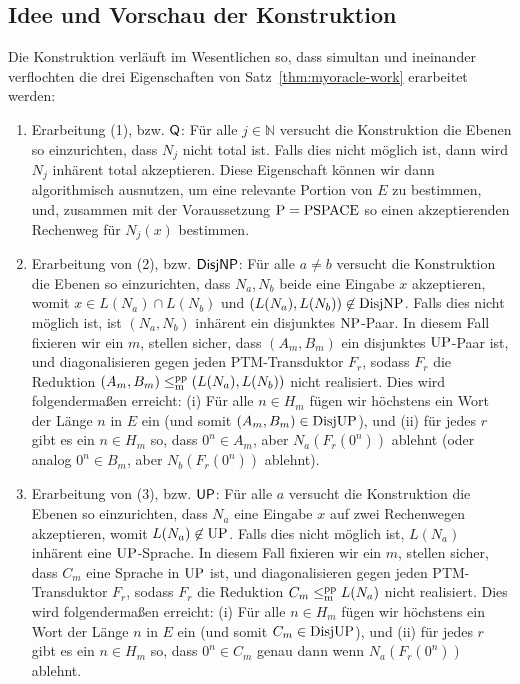 \subsection*{Idee und Vorschau der Konstruktion}

Die Konstruktion verläuft im Wesentlichen so, dass simultan und ineinander verflochten die drei Eigenschaften von Satz~\ref{thm:myoracle-work} erarbeitet werden:
\begin{enumerate}[label=\arabic*.,midpenalty=0,endpenalty=0]

    \item Erarbeitung (1), bzw. $\mathsf{Q}$: Für alle $j\in\mathbb N$ versucht die Konstruktion die Ebenen so einzurichten, dass $N_j$ nicht total ist.
        Falls dies nicht möglich ist, dann wird $N_j$ inhärent total akzeptieren. Diese Eigenschaft können wir dann algorithmisch ausnutzen, um eine relevante Portion von $E$ zu bestimmen, und, zusammen mit der Voraussetzung $\mathrm{P}=\mathrm{PSPACE}$ so einen akzeptierenden Rechenweg für $N_j(x)$ bestimmen.

    \item Erarbeitung von (2), bzw. $\mathsf{DisjNP}$: Für alle $a\neq b$ versucht die Konstruktion die Ebenen so einzurichten, dass $N_a, N_b$ beide eine Eingabe $x$ akzeptieren, womit $x\in L(N_a)\cap L(N_b)$ und $(L(N_a), L(N_b))\not\in \mathrm{DisjNP}$.
        Falls dies nicht möglich ist, ist $(N_a, N_b)$ inhärent ein disjunktes $\mathrm{NP}$-Paar.
        In diesem Fall fixieren wir ein $m$, stellen sicher, dass $(A_m,B_m)$ ein disjunktes $\mathrm{UP}$-Paar ist, und diagonalisieren gegen jeden PTM-Transduktor $F_r$, sodass $F_r$ die Reduktion $(A_m, B_m)\leq_\mathrm{m}^\mathrm{pp} (L(N_a), L(N_b))$ nicht realisiert.
        Dies wird folgendermaßen erreicht: (i) Für alle $n\in H_m$ fügen wir höchstens ein Wort der Länge $n$ in $E$ ein (und somit $(A_m, B_m)\in\mathrm{DisjUP}$), und (ii) für jedes $r$ gibt es ein $n\in H_m$ so, dass $0^{n}\in A_m$, aber $N_a(F_r(0^n))$ ablehnt (oder analog $0^n\in B_m$, aber $N_b(F_r(0^n))$ ablehnt).

    \item Erarbeitung von (3), bzw. $\mathsf{UP}$: Für alle $a$ versucht die Konstruktion die Ebenen so einzurichten, dass $N_a$ eine Eingabe $x$ auf zwei Rechenwegen akzeptieren, womit  $L(N_a)\not\in \mathrm{UP}$.
        Falls dies nicht möglich ist, $L(N_a)$ inhärent eine $\mathrm{UP}$-Sprache.
        In diesem Fall fixieren wir ein $m$, stellen sicher, dass $C_m$ eine Sprache in $\mathrm{UP}$ ist, und diagonalisieren gegen jeden PTM-Transduktor $F_r$, sodass $F_r$ die Reduktion $C_m\leq_\mathrm{m}^\mathrm{pp} L(N_a)$ nicht realisiert.
        Dies wird folgendermaßen erreicht: (i) Für alle $n\in H_m$ fügen wir höchstens ein Wort der Länge $n$ in $E$ ein (und somit $C_m\in\mathrm{DisjUP}$), und (ii) für jedes $r$ gibt es ein $n\in H_m$ so, dass $0^{n}\in C_m$ genau dann wenn $N_a(F_r(0^n))$ ablehnt.
\end{enumerate}
